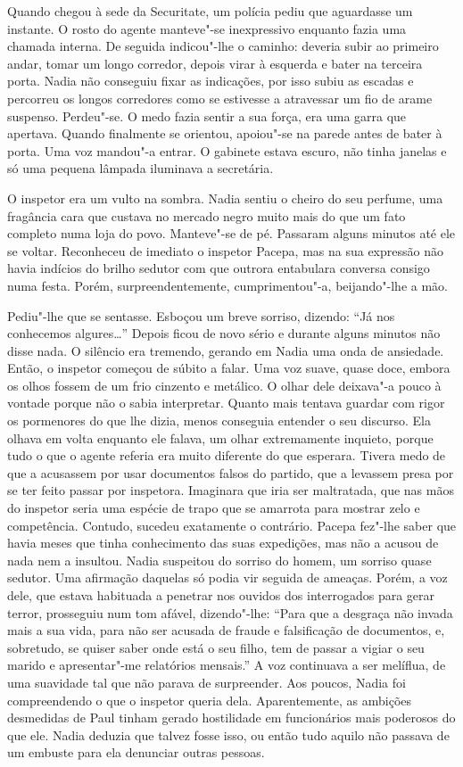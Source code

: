 Quando chegou à sede da Securitate, um polícia pediu
que aguardasse um instante. O rosto do agente manteve"-se inexpressivo
enquanto fazia uma chamada interna. De seguida indicou"-lhe o caminho:
deveria subir ao primeiro andar, tomar um longo corredor, depois virar à
esquerda e bater na terceira porta. Nadia não conseguiu fixar as indicações, por isso subiu as escadas e percorreu os longos corredores como
se estivesse a atravessar um fio de arame suspenso. Perdeu"-se. O medo
fazia sentir a sua força, era uma garra que apertava. Quando finalmente
se orientou, apoiou"-se na parede antes de bater à porta. Uma voz
mandou"-a entrar. O gabinete estava escuro, não tinha janelas e só uma
pequena lâmpada iluminava a secretária.

O inspetor era um vulto na sombra. Nadia sentiu o cheiro do seu
perfume, uma fragância cara que custava no mercado negro muito mais do
que um fato completo numa loja do povo. Manteve"-se de pé. Passaram
alguns minutos até ele se voltar. Reconheceu de imediato o inspetor
Pacepa, mas na sua expressão não havia indícios do brilho sedutor com
que outrora entabulara conversa consigo numa festa. Porém,
surpreendentemente, cumprimentou"-a, beijando"-lhe a mão.

Pediu"-lhe que se sentasse. Esboçou um breve sorriso, dizendo: ``Já nos
conhecemos algures\ldots{}'' Depois ficou de novo sério e durante alguns
minutos não disse nada. O silêncio era tremendo, gerando em Nadia uma
onda de ansiedade. Então, o inspetor começou de súbito a falar. Uma voz
suave, quase doce, embora os olhos fossem de um frio cinzento e
metálico. O olhar dele deixava"-a pouco à vontade porque não o sabia
interpretar. Quanto mais tentava guardar com rigor os pormenores do
que lhe dizia, menos conseguia entender o seu discurso. Ela olhava em
volta enquanto ele falava, um olhar extremamente inquieto, porque tudo o
que o agente referia era muito diferente do que esperara. Tivera medo de
que a acusassem por usar documentos falsos do partido, que a levassem
presa por se ter feito passar por inspetora. Imaginara que iria ser
maltratada, que nas mãos do inspetor seria uma espécie de trapo que se
amarrota para mostrar zelo e competência. Contudo, sucedeu exatamente
o contrário. Pacepa fez"-lhe saber que havia meses que tinha conhecimento das suas expedições, mas não a acusou de nada nem a insultou.
Nadia suspeitou do sorriso do homem, um sorriso quase sedutor. Uma
afirmação daquelas só podia vir seguida de ameaças. Porém, a voz dele,
que estava habituada a penetrar nos ouvidos dos interrogados para
gerar terror, prosseguiu num tom afável, dizendo"-lhe: ``Para que a
desgraça não invada mais a sua vida, para não ser acusada de fraude e
falsificação de documentos, e, sobretudo, se quiser saber onde está o
seu filho, tem de passar a vigiar o seu marido e apresentar"-me
relatórios mensais.'' A voz continuava a ser melíflua, de uma suavidade
tal que não parava de surpreender. Aos poucos, Nadia foi compreendendo
o que o inspetor queria dela. Aparentemente, as ambições desmedidas de
Paul tinham gerado hostilidade em funcionários mais poderosos do que
ele. Nadia deduzia que talvez fosse isso, ou então tudo aquilo não
passava de um embuste para ela denunciar outras pessoas.


